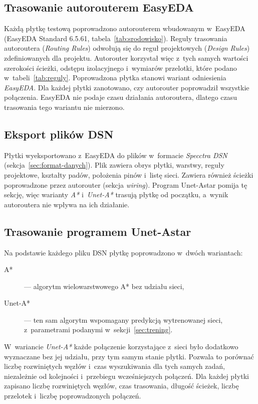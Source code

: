 \subsection{Trasowanie autorouterem EasyEDA}
\label{sec:exp-autorouter}

Każdą płytkę testową poprowadzono autorouterem wbudowanym w~EasyEDA
(EasyEDA Standard 6.5.61, tabela~\ref{tab:srodowisko}). Reguły trasowania
autoroutera (\emph{Routing Rules}) odwołują się do reguł projektowych
(\emph{Design Rules}) zdefiniowanych dla projektu. Autorouter korzystał
więc z~tych samych wartości szerokości ścieżki, odstępu izolacyjnego
i~wymiarów przelotki, które podano w~tabeli~\ref{tab:reguly}.
Poprowadzona płytka stanowi wariant odniesienia \emph{EasyEDA}.
Dla każdej płytki zanotowano, czy autorouter poprowadził wszystkie
połączenia. EasyEDA nie podaje czasu działania autoroutera, dlatego czasu
trasowania tego wariantu nie mierzono.

\subsection{Eksport plików DSN}
\label{sec:exp-dsn}

Płytki wyeksportowano z~EasyEDA do plików w~formacie \emph{Specctra DSN}
(sekcja~\ref{sec:format-danych}). Plik zawiera obrys płytki, warstwy,
reguły projektowe, kształty padów, położenia pinów i~listę sieci. Zawiera
również ścieżki poprowadzone przez autorouter (sekcja \emph{wiring}). Program
Unet-Astar pomija tę sekcję, więc warianty \emph{A*} i~\emph{Unet-A*}
trasują płytkę od początku, a~wynik autoroutera nie wpływa na ich działanie.

\subsection{Trasowanie programem Unet-Astar}
\label{sec:exp-unet-astar}

Na podstawie każdego pliku DSN płytkę poprowadzono w~dwóch wariantach:
\begin{description}
  \item[A*] --- algorytm wielowarstwowego A* bez udziału sieci,
  \item[Unet-A*] --- ten sam algorytm wspomagany predykcją wytrenowanej
    sieci, z~parametrami podanymi w~sekcji~\ref{sec:trening}.
\end{description}
W~wariancie \emph{Unet-A*} każde połączenie korzystające z~sieci było
dodatkowo wyznaczane bez jej udziału, przy tym samym stanie płytki. Pozwala
to porównać liczbę rozwiniętych węzłów i~czas wyszukiwania dla tych samych
zadań, niezależnie od kolejności i~przebiegu wcześniejszych połączeń.
Dla każdej płytki zapisano liczbę rozwiniętych węzłów, czas trasowania,
długość ścieżek, liczbę przelotek i~liczbę poprowadzonych połączeń.


